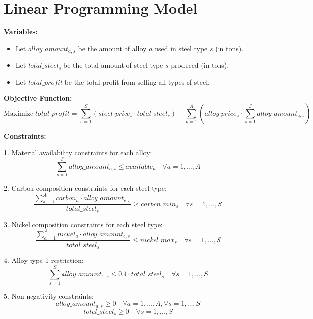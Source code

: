 \documentclass{article}
\begin{document}
\section*{Linear Programming Model}

\textbf{Variables:}
\begin{itemize}
    \item Let \( alloy\_amount_{a,s} \) be the amount of alloy \( a \) used in steel type \( s \) (in tons).
    \item Let \( total\_steel_{s} \) be the total amount of steel type \( s \) produced (in tons).
    \item Let \( total\_profit \) be the total profit from selling all types of steel.
\end{itemize}

\textbf{Objective Function:}
\[
\text{Maximize } total\_profit = \sum_{s=1}^{S} (steel\_price_{s} \cdot total\_steel_{s}) - \sum_{a=1}^{A} (alloy\_price_{a} \cdot \sum_{s=1}^{S} alloy\_amount_{a,s})
\]

\textbf{Constraints:}

1. Material availability constraints for each alloy:
\[
\sum_{s=1}^{S} alloy\_amount_{a,s} \leq available_{a} \quad \forall a = 1, \ldots, A
\]

2. Carbon composition constraints for each steel type:
\[
\frac{\sum_{a=1}^{A} carbon_{a} \cdot alloy\_amount_{a,s}}{total\_steel_{s}} \geq carbon\_min_{s} \quad \forall s = 1, \ldots, S
\]

3. Nickel composition constraints for each steel type:
\[
\frac{\sum_{a=1}^{A} nickel_{a} \cdot alloy\_amount_{a,s}}{total\_steel_{s}} \leq nickel\_max_{s} \quad \forall s = 1, \ldots, S
\]

4. Alloy type 1 restriction:
\[
\sum_{s=1}^{S} alloy\_amount_{1,s} \leq 0.4 \cdot total\_steel_{s} \quad \forall s = 1, \ldots, S
\]

5. Non-negativity constraints:
\[
alloy\_amount_{a,s} \geq 0 \quad \forall a = 1, \ldots, A, \forall s = 1, \ldots, S
\]
\[
total\_steel_{s} \geq 0 \quad \forall s = 1, \ldots, S
\]
\end{document}
